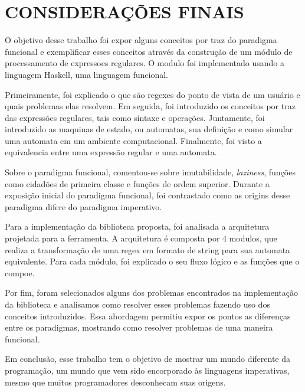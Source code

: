 \section{CONSIDERAÇÕES FINAIS}

O objetivo desse trabalho foi expor alguns conceitos por traz do paradigma funcional e exemplificar esses conceitos através da construção de um módulo de processamento de expressoes regulares.
O modulo foi implementado usando a linguagem Haskell, uma linguagem funcional.

Primeiramente, foi explicado o que são regexes do ponto de vista de um usuário e quais problemas elas resolvem.
Em seguida, foi introduzido os conceitos por traz das expressões regulares, tais como síntaxe e operações.
Juntamente, foi introduzido as maquinas de estado, ou automatas, sua definição e como simular uma automata em um ambiente computacional.
Finalmente, foi visto a equivalencia entre uma expressão regular e uma automata.

Sobre o paradigma funcional, comentou-se sobre imutabilidade, \emph{laziness}, funções como cidadões de primeira classe e funções de ordem superior.
Durante a exposição inicial do paradigma funcional, foi contrastado como as origins desse paradigma difere do paradigma imperativo.

Para a implementação da biblioteca proposta, foi analisada a arquitetura projetada para a ferramenta.
A arquitetura é composta por 4 modulos, que realiza a transformação de uma regex em formato de string para sua automata equivalente.
Para cada módulo, foi explicado o seu fluxo lógico e as funções que o compoe.

Por fim, foram selecionados alguns dos problemas encontrados na implementação da biblioteca e analisamos como resolver esses problemas  fazendo uso dos conceitos introduzidos.
Essa abordagem permitiu expor os pontos as diferenças entre os paradigmas, mostrando como resolver problemas de uma maneira funcional.

Em conclusão, esse trabalho tem o objetivo de mostrar um mundo diferente da programação, um mundo que vem sido encorporado às linguagens imperativas, mesmo que muitos programadores desconhecam suas origens.
